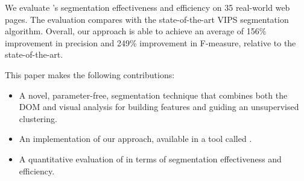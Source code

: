 We evaluate \toolname's segmentation effectiveness and efficiency
on 35 real-world web pages.
The evaluation compares \toolname with the 
state-of-the-art VIPS segmentation algorithm.
Overall, our approach is able to achieve 
an average of 156\% improvement in precision
and 249\% improvement
in F-measure, relative to the state-of-the-art.

This paper makes the following contributions:
\begin{itemize}
    \item A novel, parameter-free, segmentation technique that combines both the DOM and 
            visual analysis for building features and guiding an unsupervised clustering.
    \item An implementation of our approach,
          available in a tool called \toolname.
    \item A quantitative evaluation of \toolname in terms of
          segmentation effectiveness and efficiency.
\end{itemize}




